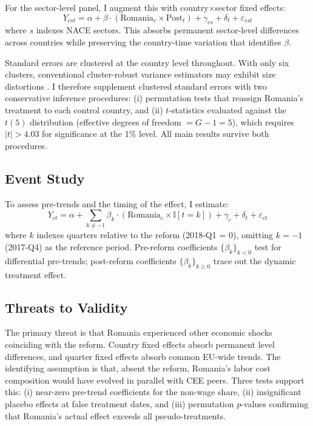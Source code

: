 \documentclass[12pt]{article}
\newcommand{\ind}{\mathbb{I}}
\begin{document}
For the sector-level panel, I augment this with country$\times$sector fixed effects:
\begin{equation}
Y_{cst} = \alpha + \beta \cdot (\text{Romania}_c \times \text{Post}_t) + \gamma_{cs} + \delta_t + \varepsilon_{cst}
\label{eq:did_sector}
\end{equation}
where $s$ indexes NACE sectors. This absorbs permanent sector-level differences across countries while preserving the country-time variation that identifies $\beta$.

Standard errors are clustered at the country level throughout. With only six clusters, conventional cluster-robust variance estimators may exhibit size distortions \citep{cameron2008bootstrap}. I therefore supplement clustered standard errors with two conservative inference procedures: (i) permutation tests that reassign Romania's treatment to each control country, and (ii) $t$-statistics evaluated against the $t(5)$ distribution (effective degrees of freedom $= G - 1 = 5$), which requires $|t| > 4.03$ for significance at the 1\% level. All main results survive both procedures.

\subsection{Event Study}

To assess pre-trends and the timing of the effect, I estimate:
\begin{equation}
Y_{ct} = \alpha + \sum_{k \neq -1} \beta_k \cdot (\text{Romania}_c \times \ind[t = k]) + \gamma_c + \delta_t + \varepsilon_{ct}
\label{eq:eventstudy}
\end{equation}
where $k$ indexes quarters relative to the reform (2018-Q1 = 0), omitting $k = -1$ (2017-Q4) as the reference period. Pre-reform coefficients $\{\beta_k\}_{k < 0}$ test for differential pre-trends; post-reform coefficients $\{\beta_k\}_{k \geq 0}$ trace out the dynamic treatment effect.

\subsection{Threats to Validity}

The primary threat is that Romania experienced other economic shocks coinciding with the reform. Country fixed effects absorb permanent level differences, and quarter fixed effects absorb common EU-wide trends. The identifying assumption is that, absent the reform, Romania's labor cost composition would have evolved in parallel with CEE peers. Three tests support this: (i) near-zero pre-trend coefficients for the non-wage share, (ii) insignificant placebo effects at false treatment dates, and (iii) permutation $p$-values confirming that Romania's actual effect exceeds all pseudo-treatments.
\end{document}
